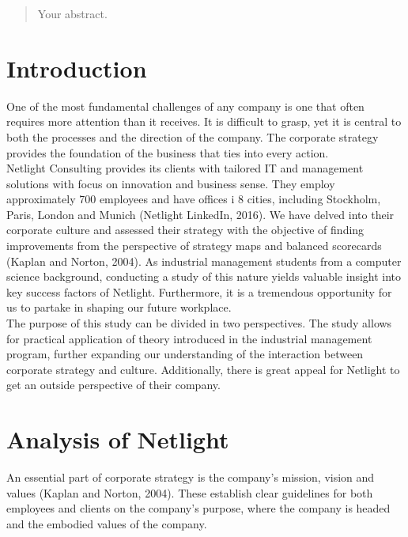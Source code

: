 \documentclass[12pt]{article}
\begin{document}
\sectionfont{\color{netpurple1}}
\subsectionfont{\color{netpurple}}
\begin{abstract}
Your abstract.
\end{abstract}
 \newpage
 
\tableofcontents
\newpage

\section*{Introduction}
One of the most fundamental challenges of any company is one that often requires more attention than it receives. It is difficult to grasp, yet it is central to both the processes and the direction of the company. The corporate strategy provides the  foundation  of the business that ties into every action. \\
\newline\noindent
Netlight Consulting provides its clients with tailored IT and management solutions with focus on innovation and business sense. They employ approximately 700 employees and have offices i 8 cities, including Stockholm, Paris, London and Munich (Netlight LinkedIn, 2016). We have delved into their corporate culture and assessed their strategy with the objective of finding improvements from the perspective of strategy maps and balanced scorecards (Kaplan and Norton, 2004). As industrial management students from a computer science background, conducting a study of this nature yields valuable insight into key success factors of Netlight. Furthermore, it is a tremendous opportunity for us to partake in shaping our future workplace. \\
\newline\noindent
The purpose of this study can be divided in two perspectives. The study allows for practical application of theory introduced in the industrial management program, further expanding our understanding of the interaction between corporate strategy and culture. Additionally, there is great appeal for Netlight to get an outside perspective of their company.

\section*{Analysis of Netlight}
An essential part of corporate strategy is the company's mission, vision and values (Kaplan and Norton, 2004). These establish clear guidelines for both employees and clients on the company's purpose, where the company is headed and the embodied values of the company. 
\end{document}
